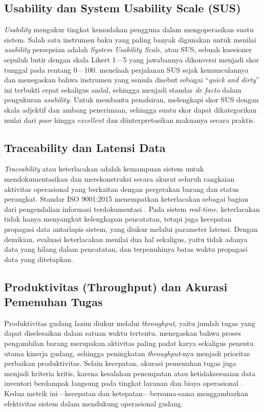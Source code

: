 \subsection{Usability dan System Usability Scale (SUS)}

\textit{Usability} mengukur tingkat kemudahan pengguna dalam mengoperasikan suatu sistem. Salah satu instrumen baku yang paling banyak digunakan untuk menilai \textit{usability} persepsian adalah \textit{System Usability Scale}, atau SUS, sebuah kuesioner sepuluh butir dengan skala Likert 1---5 yang jawabannya dikonversi menjadi skor tunggal pada rentang 0---100. \textcite{lewis2018} menelaah perjalanan SUS sejak kemunculannya dan menegaskan bahwa instrumen yang semula disebut sebagai ``\textit{quick and dirty}'' ini terbukti cepat sekaligus andal, sehingga menjadi standar \textit{de facto} dalam pengukuran \textit{usability}. Untuk membantu penafsiran, \textcite{bangor2009} melengkapi skor SUS dengan skala adjektif dan ambang penerimaan, sehingga suatu skor dapat dikategorikan mulai dari \textit{poor} hingga \textit{excellent} dan diinterpretasikan maknanya secara praktis.

\subsection{Traceability dan Latensi Data}

\textit{Traceability} atau keterlacakan adalah kemampuan sistem untuk mendokumentasikan dan merekonstruksi secara akurat seluruh rangkaian aktivitas operasional yang berkaitan dengan pergerakan barang dan status perangkat. Standar ISO 9001:2015 menempatkan keterlacakan sebagai bagian dari pengendalian informasi terdokumentasi \autocite{iso9001}. Pada sistem \textit{real-time}, keterlacakan tidak hanya menyangkut kelengkapan pencatatan, tetapi juga kecepatan propagasi data antarlapis sistem, yang diukur melalui parameter latensi. Dengan demikian, evaluasi keterlacakan menilai dua hal sekaligus, yaitu tidak adanya data yang hilang dalam pencatatan, dan terpenuhinya batas waktu propagasi data yang ditetapkan.

\subsection{Produktivitas (Throughput) dan Akurasi Pemenuhan Tugas}

Produktivitas gudang lazim diukur melalui \textit{throughput}, yaitu jumlah tugas yang dapat diselesaikan dalam satuan waktu tertentu. \textcite{dekoster2007} menegaskan bahwa proses pengambilan barang merupakan aktivitas paling padat karya sekaligus penentu utama kinerja gudang, sehingga peningkatan \textit{throughput}-nya menjadi prioritas perbaikan produktivitas. Selain kecepatan, akurasi pemenuhan tugas juga menjadi kriteria kritis, karena kesalahan penempatan atau ketidaksesuaian data inventori berdampak langsung pada tingkat layanan dan biaya operasional \autocite{habazin2017}. Kedua metrik ini---kecepatan dan ketepatan---bersama-sama menggambarkan efektivitas sistem dalam mendukung operasional gudang.

